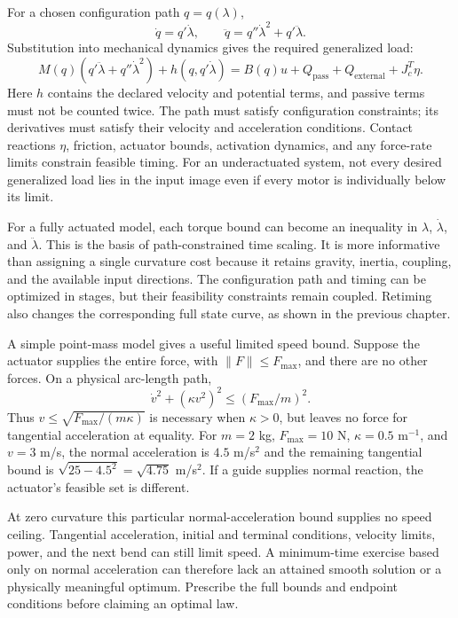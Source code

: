 \documentclass[12pt, openany]{book}
\theoremstyle{plain}
\begin{document}
For a chosen configuration path $q=q(\lambda)$,
\begin{equation}
 \dot q=q'\dot\lambda,\qquad
 \ddot q=q''\dot\lambda^2+q'\ddot\lambda.
\end{equation}
Substitution into mechanical dynamics gives the required generalized load:
\begin{equation}\label{eq:curve_path_dynamics}
 M(q)(q'\ddot\lambda+q''\dot\lambda^2)+h(q,q'\dot\lambda)
 =B(q)u+Q_{\mathrm{pass}}+Q_{\mathrm{external}}+J_c^T\eta.
\end{equation}
Here $h$ contains the declared velocity and potential terms, and passive
terms must not be counted twice. The path must satisfy configuration
constraints; its derivatives must satisfy their velocity and acceleration
conditions. Contact reactions $\eta$, friction, actuator bounds, activation
dynamics, and any force-rate limits constrain feasible timing. For an
underactuated system, not every desired generalized load lies in the input
image even if every motor is individually below its limit.

For a fully actuated model, each torque bound can become an inequality in
$\lambda$, $\dot\lambda$, and $\ddot\lambda$. This is the basis of
path-constrained time scaling. It is more informative than assigning a
single curvature cost because it retains gravity, inertia, coupling, and
the available input directions. The configuration path and timing can be
optimized in stages, but their feasibility constraints remain coupled.
Retiming also changes the corresponding full state curve, as shown in the
previous chapter.

A simple point-mass model gives a useful limited speed bound. Suppose the
actuator supplies the entire force, with $\|F\|\le F_{\max}$, and there are
no other forces. On a physical arc-length path,
\begin{equation}
 \dot v^2+(\kappa v^2)^2\le(F_{\max}/m)^2.
\end{equation}
Thus $v\le\sqrt{F_{\max}/(m\kappa)}$ is necessary when $\kappa>0$, but leaves
no force for tangential acceleration at equality. For $m=2$ kg,
$F_{\max}=10$ N, $\kappa=0.5$ m$^{-1}$, and $v=3$ m/s, the normal
acceleration is $4.5$ m/s$^2$ and the remaining tangential bound is
$\sqrt{25-4.5^2}=\sqrt{4.75}$ m/s$^2$. If a guide supplies normal reaction,
the actuator's feasible set is different.

At zero curvature this particular normal-acceleration bound supplies no
speed ceiling. Tangential acceleration, initial and terminal conditions,
velocity limits, power, and the next bend can still limit speed. A
minimum-time exercise based only on normal acceleration can therefore lack
an attained smooth solution or a physically meaningful optimum. Prescribe
the full bounds and endpoint conditions before claiming an optimal law.
\end{document}
